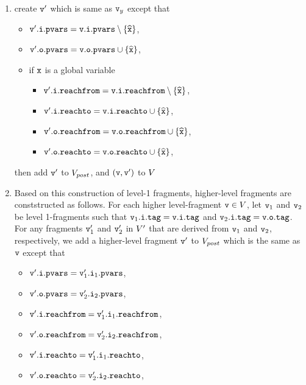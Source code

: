 \begin{enumerate}
\item create $\mathtt{v}'$ which is same as $\mathtt{v}_y$ except that
\begin{itemize}
\item $\mathtt{v}'.\mathtt{i}.\mathtt{pvars} = \mathtt{v}.\mathtt{i}.\mathtt{pvars} \setminus \left\{\widehat{\mathtt{x}}\right\}$,
\item $\mathtt{v}'.\mathtt{o}.\mathtt{pvars} = \mathtt{v}.\mathtt{o}.\mathtt{pvars} \cup \left\{\widehat{\mathtt{x}}\right\}$,
\item if $\tt x$ is a global variable
\begin{itemize}
\item $\mathtt{v}'.\mathtt{i}.\mathtt{reachfrom} = \mathtt{v}.\mathtt{i}.\mathtt{reachfrom} \setminus \left\{\widehat{\mathtt{x}}\right\}$,
\item $\mathtt{v}'.\mathtt{i}.\mathtt{reachto} = \mathtt{v}.\mathtt{i}.\mathtt{reachto} \cup \left\{\widehat{\mathtt{x}}\right\}$,
 \item $\mathtt{v}'.\mathtt{o}.\mathtt{reachfrom} = \mathtt{v}.\mathtt{o}.\mathtt{reachfrom} \cup \left\{\widehat{\mathtt{x}}\right\}$,
 \item $\mathtt{v}'.\mathtt{o}.\mathtt{reachto} = \mathtt{v}.\mathtt{o}.\mathtt{reachto} \cup \left\{\widehat{\mathtt{x}}\right\}$,
\end{itemize}
\end{itemize}
then add $\mathtt{v}'$ to $V_{post}$, and $(\mathtt{v},\mathtt{v}')$ to $V$
\item
Based on this construction of level-1 fragments, higher-level fragments are
   conststructed as follows.
     For each higher level-fragment $\mathtt{v} \in V$, let
     $\mathtt{v}_1$ and $\mathtt{v}_2$ be level 1-fragments such that
     $\mathtt{v}_1.\mathtt{i}.\mathtt{tag} = \mathtt{v}.\mathtt{i}.\mathtt{tag}$ and
     $\mathtt{v}_2.\mathtt{i}.\mathtt{tag} = \mathtt{v}.\mathtt{o}.\mathtt{tag}$.
     For any fragments $\mathtt{v}_1'$ and $\mathtt{v}_2'$ in $V'$ that are derived from
     $\mathtt{v}_1$ and $\mathtt{v}_2$, respectively, we add a higher-level
     fragment $\mathtt{v}'$ to $V_{post}$
     which is the same as $\mathtt{v}$ except that 
\begin{itemize}
\item $\mathtt{v}'.\mathtt{i}.\mathtt{pvars} = \mathtt{v}_1'.\mathtt{i}_1.\mathtt{pvars}$,
\item $\mathtt{v}'.\mathtt{o}.\mathtt{pvars} = \mathtt{v}_2'.\mathtt{i}_2.\mathtt{pvars}$,
\item $\mathtt{v}'.\mathtt{i}.\mathtt{reachfrom} = \mathtt{v}_1'.\mathtt{i}_1.\mathtt{reachfrom}$,
\item $\mathtt{v}'.\mathtt{o}.\mathtt{reachfrom} = \mathtt{v}_2'.\mathtt{i}_2.\mathtt{reachfrom}$,
\item $\mathtt{v}'.\mathtt{i}.\mathtt{reachto} = \mathtt{v}_1'.\mathtt{i}_1.\mathtt{reachto}$,
\item $\mathtt{v}'.\mathtt{o}.\mathtt{reachto} =  \mathtt{v}_2'.\mathtt{i}_2.\mathtt{reachto}$,
\end{itemize}
\end{enumerate}
